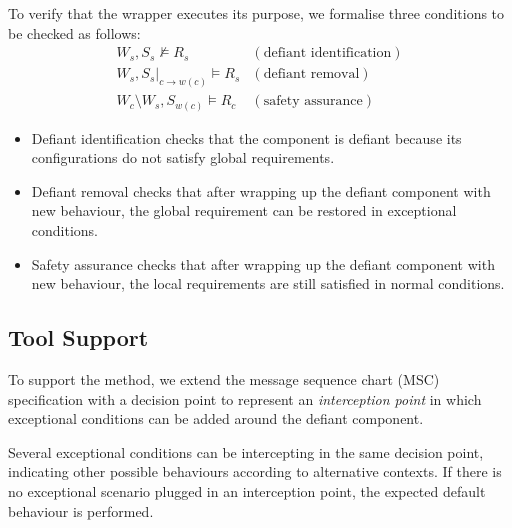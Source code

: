 To verify that the wrapper executes its purpose, we formalise three conditions to be checked as follows:
\[
\begin{array}{ll}
W_s, S_s \not \models R_s & (\mbox{defiant identification})\\
W_s, S_s |_{c\rightarrow w(c)} \models R_s & (\mbox{defiant removal}) \\
W_c \setminus W_s, S_{w(c)} \models R_c & (\mbox{safety assurance})
\end{array}
\]
\begin{itemize}
\item Defiant identification checks that the component is defiant because its configurations do not satisfy global requirements.

\item Defiant removal checks that after wrapping up the defiant component with new behaviour, the global requirement can be restored in exceptional conditions.

\item Safety assurance checks that after wrapping up the defiant component with new behaviour, the local requirements are still satisfied in normal conditions. 
\end{itemize}


\subsection{Tool Support}
To support the method, we extend the message sequence chart (MSC) specification with a decision point  to represent an \textit{interception point} in which exceptional conditions can be added around the defiant component. 

Several exceptional conditions can be intercepting in the same decision point, indicating other possible behaviours according to alternative contexts. If there is no exceptional scenario plugged in an interception point, the expected default behaviour is performed.


